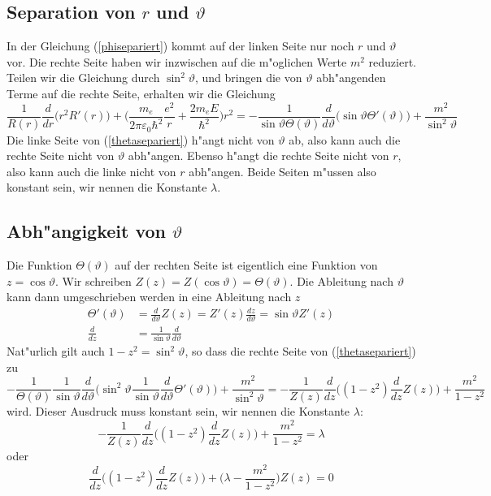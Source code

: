 \subsection{Separation von $r$ und $\vartheta$}
In der Gleichung (\ref{phisepariert}) kommt auf der linken Seite nur
noch $r$ und $\vartheta$ vor.  Die rechte Seite haben wir inzwischen auf
die m"oglichen Werte $m^2$ reduziert. Teilen wir die Gleichung durch
$\sin^2\vartheta$, und bringen die von $\vartheta$ abh"angenden Terme
auf die rechte Seite, erhalten wir die Gleichung
\begin{equation}
\frac{1}{R(r)}\frac{d}{dr}\bigl(r^2R'(r)\bigr)
+\biggl(\frac{m_e}{2\pi\varepsilon_0\hbar^2}\frac{e^2}{r}
+
\frac{2m_eE}{\hbar^2}\biggr)r^2
=
-
\frac1{\sin\vartheta\Theta(\vartheta) }
\frac{d}{d\vartheta}\bigl(\sin\vartheta \Theta'(\vartheta)\bigr)
+
\frac{m^2}{\sin^2\vartheta}
\label{thetasepariert}
\end{equation}
Die linke Seite von (\ref{thetasepariert}) h"angt nicht von $\vartheta$
ab, also kann auch die rechte Seite nicht von $\vartheta$ abh"angen.
Ebenso h"angt die rechte Seite nicht von $r$, also kann auch die linke
nicht von $r$ abh"angen. Beide Seiten m"ussen also konstant sein,
wir nennen die Konstante $\lambda$.

\subsection{Abh"angigkeit von $\vartheta$}
Die Funktion $\Theta(\vartheta)$ auf der rechten Seite ist eigentlich
eine Funktion von $z=\cos\vartheta$. Wir schreiben
$Z(z)=Z(\cos\vartheta)=\Theta(\vartheta)$. Die Ableitung nach $\vartheta$
kann dann umgeschrieben werden in eine Ableitung nach $z$
\begin{align*}
\Theta'(\vartheta)&=
\frac{d}{d\vartheta}Z(z)=Z'(z)\frac{dz}{d\vartheta}=\sin\vartheta Z'(z)
\\
\frac{d}{dz}&=\frac1{\sin\vartheta}\frac{d}{d\vartheta}
\end{align*}
Nat"urlich gilt auch $1-z^2=\sin^2\vartheta$, so dass die rechte Seite
von (\ref{thetasepariert}) zu
\begin{equation}
-
\frac1{\Theta(\vartheta)}
\frac1{\sin\vartheta}
\frac{d}{d\vartheta}\biggl(
\sin^2\vartheta \frac1{\sin\vartheta}\frac{d}{d\vartheta}\Theta'(\vartheta)
\biggr)
+
\frac{m^2}{\sin^2\vartheta}
=
-\frac1{Z(z)}\frac{d}{dz}\biggl(
(1-z^2)\frac{d}{dz}Z(z)
\biggr)
+
\frac{m^2}{1-z^2}
\end{equation}
wird. Dieser Ausdruck muss konstant sein, wir nennen die Konstante 
$\lambda$:
\begin{equation}
-\frac1{Z(z)}\frac{d}{dz}\biggl(
(1-z^2)\frac{d}{dz}Z(z)
\biggr)
+
\frac{m^2}{1-z^2}
=\lambda
\end{equation}
oder
\begin{equation}
\frac{d}{dz}\biggl(
(1-z^2)\frac{d}{dz}Z(z)
\biggr)
+\biggl(\lambda
-
\frac{m^2}{1-z^2}
\biggr)Z(z)
=0
\label{legendregleichung}
\end{equation}

